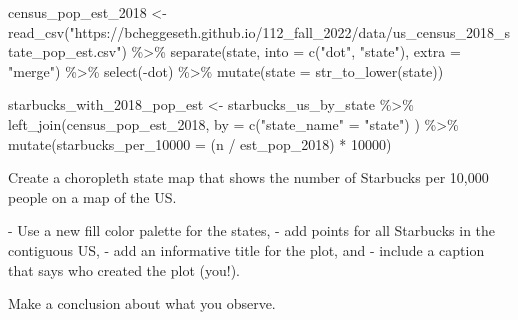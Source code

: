 \documentclass[
  letterpaper,
  DIV=11,
  numbers=noendperiod]{scrreprt}
\newenvironment{Shaded}{\begin{snugshade}}{\end{snugshade}}
\newcommand{\AttributeTok}[1]{\textcolor[rgb]{0.40,0.45,0.13}{#1}}
\newcommand{\DecValTok}[1]{\textcolor[rgb]{0.68,0.00,0.00}{#1}}
\newcommand{\FunctionTok}[1]{\textcolor[rgb]{0.28,0.35,0.67}{#1}}
\newcommand{\NormalTok}[1]{\textcolor[rgb]{0.00,0.23,0.31}{#1}}
\newcommand{\OtherTok}[1]{\textcolor[rgb]{0.00,0.23,0.31}{#1}}
\newcommand{\SpecialCharTok}[1]{\textcolor[rgb]{0.37,0.37,0.37}{#1}}
\newcommand{\StringTok}[1]{\textcolor[rgb]{0.13,0.47,0.30}{#1}}
\begin{document}
\begin{Shaded}
\begin{Highlighting}[]
\NormalTok{census\_pop\_est\_2018 }\OtherTok{\textless{}{-}} \FunctionTok{read\_csv}\NormalTok{(}\StringTok{"https://bcheggeseth.github.io/112\_fall\_2022/data/us\_census\_2018\_state\_pop\_est.csv"}\NormalTok{) }\SpecialCharTok{\%\textgreater{}\%}
  \FunctionTok{separate}\NormalTok{(state, }\AttributeTok{into =} \FunctionTok{c}\NormalTok{(}\StringTok{"dot"}\NormalTok{, }\StringTok{"state"}\NormalTok{), }\AttributeTok{extra =} \StringTok{"merge"}\NormalTok{) }\SpecialCharTok{\%\textgreater{}\%}
  \FunctionTok{select}\NormalTok{(}\SpecialCharTok{{-}}\NormalTok{dot) }\SpecialCharTok{\%\textgreater{}\%}
  \FunctionTok{mutate}\NormalTok{(}\AttributeTok{state =} \FunctionTok{str\_to\_lower}\NormalTok{(state))}
\end{Highlighting}
\end{Shaded}

\begin{Shaded}
\begin{Highlighting}[]
\NormalTok{starbucks\_with\_2018\_pop\_est }\OtherTok{\textless{}{-}}
\NormalTok{  starbucks\_us\_by\_state }\SpecialCharTok{\%\textgreater{}\%}
  \FunctionTok{left\_join}\NormalTok{(census\_pop\_est\_2018,}
    \AttributeTok{by =} \FunctionTok{c}\NormalTok{(}\StringTok{"state\_name"} \OtherTok{=} \StringTok{"state"}\NormalTok{)}
\NormalTok{  ) }\SpecialCharTok{\%\textgreater{}\%}
  \FunctionTok{mutate}\NormalTok{(}\AttributeTok{starbucks\_per\_10000 =}\NormalTok{ (n }\SpecialCharTok{/}\NormalTok{ est\_pop\_2018) }\SpecialCharTok{*} \DecValTok{10000}\NormalTok{)}
\end{Highlighting}
\end{Shaded}

\begin{Shaded}
\begin{Highlighting}[]
\NormalTok{Create a choropleth state map that shows the number of Starbucks per 10,000 people on a map of the US. }

\NormalTok{{-} Use a new fill color palette for the states, }
\NormalTok{{-} add points for all Starbucks in the contiguous US, }
\NormalTok{{-} add an informative title for the plot, and }
\NormalTok{{-} include a caption that says who created the plot (you!). }

\NormalTok{Make a conclusion about what you observe.   }
\end{Highlighting}
\end{Shaded}
\end{document}
